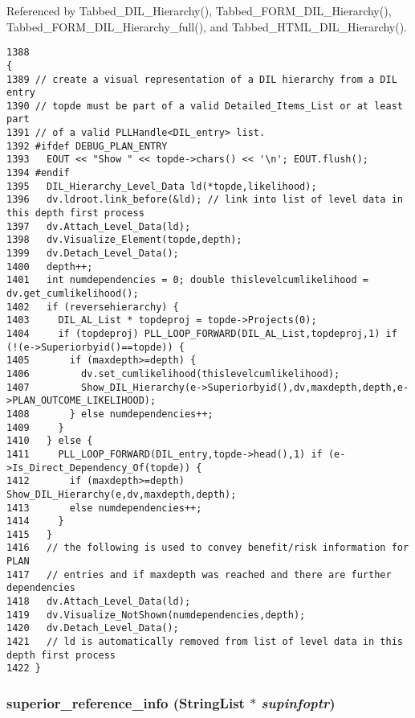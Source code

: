 Referenced by Tabbed\_\-DIL\_\-Hierarchy(), Tabbed\_\-FORM\_\-DIL\_\-Hierarchy(), Tabbed\_\-FORM\_\-DIL\_\-Hierarchy\_\-full(), and Tabbed\_\-HTML\_\-DIL\_\-Hierarchy().



\footnotesize\begin{verbatim}1388                                                                                                                                                {
1389 // create a visual representation of a DIL hierarchy from a DIL entry
1390 // topde must be part of a valid Detailed_Items_List or at least part
1391 // of a valid PLLHandle<DIL_entry> list.
1392 #ifdef DEBUG_PLAN_ENTRY
1393   EOUT << "Show " << topde->chars() << '\n'; EOUT.flush();
1394 #endif
1395   DIL_Hierarchy_Level_Data ld(*topde,likelihood);
1396   dv.ldroot.link_before(&ld); // link into list of level data in this depth first process
1397   dv.Attach_Level_Data(ld);
1398   dv.Visualize_Element(topde,depth);
1399   dv.Detach_Level_Data();
1400   depth++;
1401   int numdependencies = 0; double thislevelcumlikelihood = dv.get_cumlikelihood();
1402   if (reversehierarchy) {
1403     DIL_AL_List * topdeproj = topde->Projects(0);
1404     if (topdeproj) PLL_LOOP_FORWARD(DIL_AL_List,topdeproj,1) if (!(e->Superiorbyid()==topde)) {
1405       if (maxdepth>=depth) {
1406         dv.set_cumlikelihood(thislevelcumlikelihood);
1407         Show_DIL_Hierarchy(e->Superiorbyid(),dv,maxdepth,depth,e->PLAN_OUTCOME_LIKELIHOOD);
1408       } else numdependencies++;
1409     }
1410   } else {
1411     PLL_LOOP_FORWARD(DIL_entry,topde->head(),1) if (e->Is_Direct_Dependency_Of(topde)) {
1412       if (maxdepth>=depth) Show_DIL_Hierarchy(e,dv,maxdepth,depth);
1413       else numdependencies++;
1414     }
1415   }
1416   // the following is used to convey benefit/risk information for PLAN
1417   // entries and if maxdepth was reached and there are further dependencies
1418   dv.Attach_Level_Data(ld);
1419   dv.Visualize_NotShown(numdependencies,depth);
1420   dv.Detach_Level_Data();
1421   // ld is automatically removed from list of level data in this depth first process
1422 }
\end{verbatim}\normalsize 
{}
\subsubsection{ superior\_\-reference\_\-info ({\bf String\-List} $\ast$ {\em supinfoptr})}\label{diladmin_8cc_a2}




